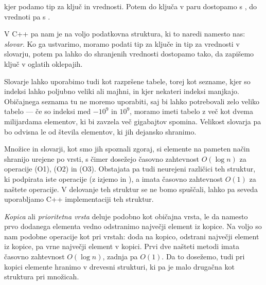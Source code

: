 
\vspace{-0.5cm}
\noindent
kjer podamo tip za ključ in vrednosti.
Potem do ključa v paru dostopamo s , do vrednoti pa s
.

V C++ pa nam je na voljo podatkovna struktura, ki to naredi namesto nas:
\emph{slovar}.
Ko ga ustvarimo, moramo podati tip za ključe in tip za vrednosti v slovarju,
potem pa lahko do shranjenih vrednosti dostopamo tako, da zapišemo ključ v
oglatih oklepajih.


Slovarje lahko uporabimo tudi kot razpršene tabele, torej kot sezname, kjer so
indeksi lahko poljubno veliki ali majhni, in kjer nekateri indeksi manjkajo. 
Običajnega seznama tu ne moremo uporabiti, saj bi lahko potrebovali zelo veliko
tabelo --- če so indeksi med $-10^9$ in $10^9$, moramo imeti tabelo z več kot
dvema milijardama elementov, ki bi zavzela več gigabajtov spomina.
Velikost slovarja pa bo odvisna le od števila elementov, ki jih dejansko
shranimo.



Množice in slovarji, kot smo jih spoznali zgoraj, si elemente na pameten način
shranijo urejene po vrsti, s čimer dosežejo časovno zahtevnost $O(\log n)$ za
operacije (O1), (O2) in (O3).
Obstajata pa tudi neurejeni različici teh struktur, ki podpirata iste operacije
(z izjemo  in ), a imata časovno zahtevnost
$O(1)$ za naštete operacije.
V delovanje teh struktur se ne bomo spuščali, lahko pa seveda uporabljamo C++
implementaciji teh struktur.



\emph{Kopica} ali \emph{prioritetna vrsta} deluje podobno kot običajna vrsta, le
da namesto prvo dodanega elementa vedno odstranimo največji element iz kopice.
Na voljo so nam podobne operacije kot pri vrstah:  doda 
na kopico,  odstrani največji element iz kopice,  pa
vrne največji element v kopici.
Prvi dve našteti metodi imata časovno zahtevnost $O(\log n)$, zadnja pa $O(1)$.
Da to dosežemo, tudi pri kopici elemente hranimo v drevesni strukturi, ki pa je
malo drugačna kot struktura pri množicah.

